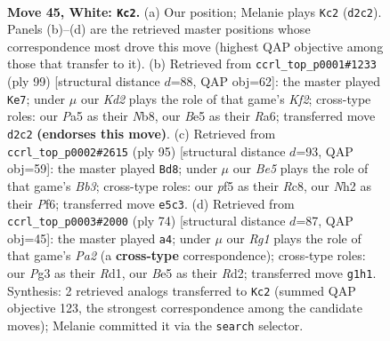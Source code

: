 \documentclass[11pt]{article}
\begin{document}
\clearpage

\begin{figure}[p]\centering
\begin{subfigure}{0.46\textwidth}\centering
\resizebox{\linewidth}{!}{%
\newchessgame
\chessboard[
  setfen={5b1r/1r2k1p1/p1p4p/Pp1bBp2/2p4P/4P1P1/1P1K1P1N/R5R1 w - - 6 45},
  showmover=false,
  pgfstyle=straightmove, color=movearrow, markmove={d2-c2}
]}
\caption{}
\end{subfigure}\hfill
\begin{subfigure}{0.46\textwidth}\centering
\resizebox{\linewidth}{!}{%
\newchessgame
\chessboard[
  setfen={1n6/p4k2/r1p1p2b/1p2Pp2/1P1P2p1/P5P1/NBR1KP1r/5R2 b - - 24 50},
  showmover=false,
  pgfstyle=straightmove, color=movearrow, markmove={f7-e7}
]}
\caption{}
\end{subfigure}
\\[4pt]
\begin{subfigure}{0.46\textwidth}\centering
\resizebox{\linewidth}{!}{%
\newchessgame
\chessboard[
  setfen={2r5/3k4/1bp1ppp1/p2r3p/2RP3P/1PR1BKP1/P4P2/8 b - - 23 48},
  showmover=false,
  pgfstyle=straightmove, color=movearrow, markmove={b6-d8}
]}
\caption{}
\end{subfigure}\hfill
\begin{subfigure}{0.46\textwidth}\centering
\resizebox{\linewidth}{!}{%
\newchessgame
\chessboard[
  setfen={3r4/5pk1/pprpp2p/4b1pP/2P1P1P1/1P2B3/P2R1PK1/3R4 w - - 1 38},
  showmover=false,
  pgfstyle=straightmove, color=movearrow, markmove={a2-a4}
]}
\caption{}
\end{subfigure}
\caption{\textbf{Move 45, White: \texttt{Kc2}.} (a) Our position; Melanie plays \texttt{Kc2} (\texttt{d2c2}). Panels (b)--(d) are the retrieved master positions whose correspondence most drove this move (highest QAP objective among those that transfer to it). (b) Retrieved from \texttt{ccrl\_top\_p0001\#1233} (ply 99) [structural distance $d$=88, QAP obj=62]: the master played \texttt{Ke7}; under $\mu$ our \emph{Kd2} plays the role of that game's \emph{Kf2}; cross-type roles: our \emph{P}a5 as their \emph{N}b8, our \emph{B}e5 as their \emph{R}a6; transferred move \texttt{d2c2} \textbf{(endorses this move)}. (c) Retrieved from \texttt{ccrl\_top\_p0002\#2615} (ply 95) [structural distance $d$=93, QAP obj=59]: the master played \texttt{Bd8}; under $\mu$ our \emph{Be5} plays the role of that game's \emph{Bb3}; cross-type roles: our \emph{p}f5 as their \emph{R}c8, our \emph{N}h2 as their \emph{P}f6; transferred move \texttt{e5c3}. (d) Retrieved from \texttt{ccrl\_top\_p0003\#2000} (ply 74) [structural distance $d$=87, QAP obj=45]: the master played \texttt{a4}; under $\mu$ our \emph{Rg1} plays the role of that game's \emph{Pa2} (a \textbf{cross-type} correspondence); cross-type roles: our \emph{P}g3 as their \emph{R}d1, our \emph{B}e5 as their \emph{R}d2; transferred move \texttt{g1h1}. Synthesis: 2 retrieved analogs transferred to \texttt{Kc2} (summed QAP objective 123, the strongest correspondence among the candidate moves); Melanie committed it via the \texttt{search} selector.}
\label{fig:thought-m88}
\end{figure}
\end{document}
